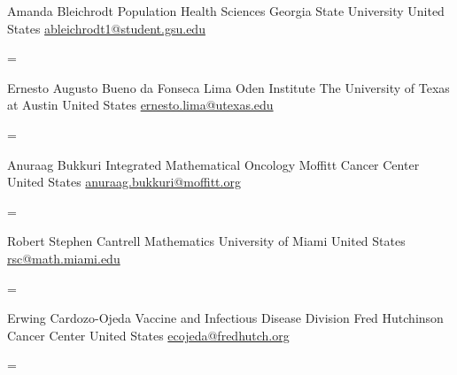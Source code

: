 \documentclass[
  letterpaper,
  DIV=11,
  numbers=noendperiod]{scrartcl}
\newenvironment{absolutelynopagebreak}
  {\par\nobreak\vfil\penalty0\vfilneg
   \vtop\bgroup}
  {\par\xdef\tpd{\the\prevdepth}\egroup
   \prevdepth=\tpd}
\begin{document}
\begin{absolutelynopagebreak}Amanda   Bleichrodt \newline
\mbox{}\quad  Population Health Sciences \newline
\mbox{}\quad  Georgia State University \newline
\mbox{}\quad  United States \newline
\mbox{}\quad \href{mailto: ableichrodt1@student.gsu.edu }{ ableichrodt1@student.gsu.edu }
\end{absolutelynopagebreak}\vskip0.2cm
\begin{absolutelynopagebreak}Ernesto Augusto   Bueno da Fonseca Lima \newline
\mbox{}\quad  Oden Institute \newline
\mbox{}\quad  The University of Texas at Austin \newline
\mbox{}\quad  United States \newline
\mbox{}\quad \href{mailto: ernesto.lima@utexas.edu }{ ernesto.lima@utexas.edu }
\end{absolutelynopagebreak}\vskip0.2cm
\begin{absolutelynopagebreak}Anuraag   Bukkuri \newline
\mbox{}\quad  Integrated Mathematical Oncology \newline
\mbox{}\quad  Moffitt Cancer Center \newline
\mbox{}\quad  United States \newline
\mbox{}\quad \href{mailto: anuraag.bukkuri@moffitt.org }{ anuraag.bukkuri@moffitt.org }
\end{absolutelynopagebreak}\vskip0.2cm
\begin{absolutelynopagebreak}Robert Stephen   Cantrell \newline
\mbox{}\quad  Mathematics \newline
\mbox{}\quad  University of Miami \newline
\mbox{}\quad  United States \newline
\mbox{}\quad \href{mailto: rsc@math.miami.edu }{ rsc@math.miami.edu }
\end{absolutelynopagebreak}\vskip0.2cm
\begin{absolutelynopagebreak}Erwing   Cardozo-Ojeda \newline
\mbox{}\quad  Vaccine and Infectious Disease Division \newline
\mbox{}\quad  Fred Hutchinson Cancer Center \newline
\mbox{}\quad  United States \newline
\mbox{}\quad \href{mailto: ecojeda@fredhutch.org }{ ecojeda@fredhutch.org }
\end{absolutelynopagebreak}\vskip0.2cm
\end{document}
